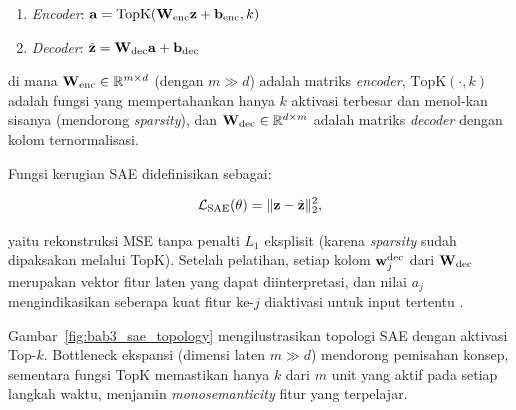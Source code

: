 \begin{enumerate}
  \item \emph{Encoder}: $\mathbf{a} = \text{TopK}(\mathbf{W}_{\rm enc}
    \mathbf{z} + \mathbf{b}_{\rm enc}, k)$
  \item \emph{Decoder}: $\hat{\mathbf{z}} = \mathbf{W}_{\rm dec}
    \mathbf{a} + \mathbf{b}_{\rm dec}$
\end{enumerate}

\noindent di mana $\mathbf{W}_{\rm enc} \in \mathbb{R}^{m \times d}$ (dengan
$m \gg d$) adalah matriks \emph{encoder}, $\text{TopK}(\cdot, k)$ adalah
fungsi yang mempertahankan hanya $k$ aktivasi terbesar dan menol-kan sisanya
(mendorong \emph{sparsity}), dan $\mathbf{W}_{\rm dec} \in \mathbb{R}^{d \times m}$
adalah matriks \emph{decoder} dengan kolom ternormalisasi.

Fungsi kerugian SAE didefinisikan sebagai:

\begin{equation}\label{eq:bab3_sae_loss}
  \mathcal{L}_{\rm SAE}(\theta) = \|\mathbf{z} - \hat{\mathbf{z}}\|_2^2,
\end{equation}

\noindent yaitu rekonstruksi MSE tanpa penalti $L_1$ eksplisit (karena
\emph{sparsity} sudah dipaksakan melalui TopK). Setelah pelatihan, setiap
kolom $\mathbf{w}_j^{\rm dec}$ dari $\mathbf{W}_{\rm dec}$ merupakan vektor
fitur laten yang dapat diinterpretasi, dan nilai $a_j$ mengindikasikan
seberapa kuat fitur ke-$j$ diaktivasi untuk input tertentu
.

Gambar~\ref{fig:bab3_sae_topology} mengilustrasikan topologi SAE dengan
aktivasi Top-$k$. Bottleneck ekspansi (dimensi laten $m \gg d$) mendorong
pemisahan konsep, sementara fungsi TopK memastikan hanya $k$ dari $m$ unit
yang aktif pada setiap langkah waktu, menjamin \emph{monosemanticity}
fitur yang terpelajar.

